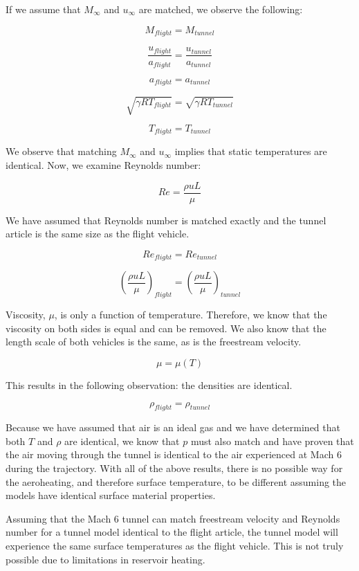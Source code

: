 \documentclass[../main.tex]{subfiles}
\begin{document}
If we assume that \(M_\infty\) and \(u_\infty\) are matched, we observe the following:

\[
    M_{flight} = M_{tunnel}
\]

\[
    \frac{u_{flight}}{a_{flight}} = \frac{u_{tunnel}}{a_{tunnel}}
\]

\[
    a_{flight} = a_{tunnel}
\]

\[
    \sqrt{\gamma R T_{flight}} = \sqrt{\gamma R T_{tunnel}}
\]

\[
    \boxed{
     T_{flight} = T_{tunnel}
    }
\]

We observe that matching \(M_\infty\) and \(u_\infty\) implies that static temperatures are identical.
Now, we examine Reynolds number:

\[
    Re = \frac{\rho u L}{\mu}
\]

We have assumed that Reynolds number is matched exactly and the tunnel article is the same size as the flight vehicle.

\[
    Re_{flight} = Re_{tunnel}
\]

\[
    \left({\frac{\rho u L}{\mu}}\right)_{flight} = \left({\frac{\rho u L}{\mu}}\right)_{tunnel}
\]

Viscosity, \(\mu\), is only a function of temperature.
Therefore, we know that the viscosity on both sides is equal and can be removed.
We also know that the length scale of both vehicles is the same, as is the freestream velocity.

\[
    \mu = \mu(T)
\]

This results in the following observation: the densities are identical. 

\[
    \boxed{
    \rho_{flight} = \rho_{tunnel}
    }
\]

Because we have assumed that air is an ideal gas and we have determined that both \(T\) and \(\rho\) are identical, we know that \(p\) must also match and have proven that the air moving through the tunnel is identical to the air experienced at Mach 6 during the trajectory.
With all of the above results, there is no possible way for the aeroheating, and therefore surface temperature, to be different assuming the models have identical surface material properties.

\discussion{}

Assuming that the Mach 6 tunnel can match freestream velocity and Reynolds number for a tunnel model identical to the flight article, the tunnel model will experience the same surface temperatures as the flight vehicle.
This is not truly possible due to limitations in reservoir heating.
\end{document}
